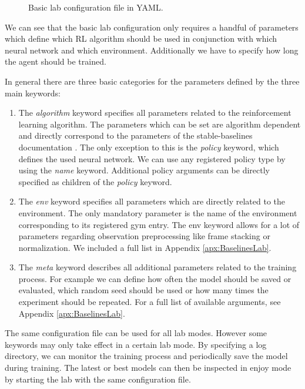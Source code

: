 \begin{figure}[h]
    
    \caption[Basic lab configuration file]{Basic lab configuration file in YAML.}
    \label{fig:BasicLabConfig}
\end{figure}


We can see that the basic lab configuration only requires a handful of parameters which define which RL algorithm should be used in conjunction with which neural network and which environment. Additionally we have to specify how long the agent should be trained. 

In general there are three basic categories for the parameters defined by the three main keywords: 

\begin{enumerate}
    \item The \textit{algorithm} keyword specifies all parameters related to the reinforcement learning algorithm. The parameters which can be set are algorithm dependent and directly correspond to the parameters of the stable-baselines documentation \cite{stable-baselines-docs}. The only exception to this is the \textit{policy} keyword, which defines the used neural network. We can use any registered policy type by using the \textit{name} keyword. Additional policy arguments can be directly specified as children of the \textit{policy} keyword.
    \item The \textit{env} keyword specifies all parameters which are directly related to the environment. The only mandatory parameter is the name of the environment corresponding to its registered gym entry. The env keyword allows for a lot of parameters regarding observation preprocessing like frame stacking or normalization. We included a full list in Appendix \ref{apx:BaselinesLab}. 
    \item  The \textit{meta} keyword describes all additional parameters related to the training process. For example we can define how often the model should be saved or evaluated, which random seed should be used or how many times the experiment should be repeated. For a full list of available arguments, see Appendix \ref{apx:BaselinesLab}.
\end{enumerate}

The same configuration file can be used for all lab modes. However some keywords may only take effect in a certain lab mode. By specifying a log directory, we can monitor the training process and periodically save the model during training. The latest or best models can then be inspected in enjoy mode by starting the lab with the same configuration file. 

